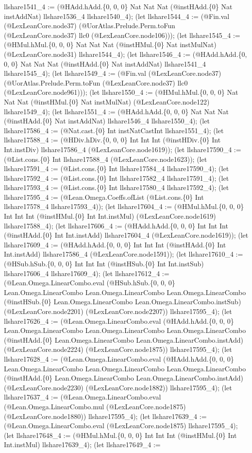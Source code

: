 \documentclass[11pt]{article}
\begin{document}
llshare1541\_4 := (@HAdd.hAdd.\{0, 0, 0\} Nat Nat Nat (@instHAdd.\{0\} Nat instAddNat) llshare1536\_4 llshare1540\_4); (let llshare1544\_4 := (@Fin.val (@LexLeanCore.node37) (@UorAtlas.Prelude.Perm.toFun (@LexLeanCore.node37) llc0 (@LexLeanCore.node106))); (let llshare1545\_4 := (@HMul.hMul.\{0, 0, 0\} Nat Nat Nat (@instHMul.\{0\} Nat instMulNat) (@LexLeanCore.node31) llshare1544\_4); (let llshare1546\_4 := (@HAdd.hAdd.\{0, 0, 0\} Nat Nat Nat (@instHAdd.\{0\} Nat instAddNat) llshare1541\_4 llshare1545\_4); (let llshare1549\_4 := (@Fin.val (@LexLeanCore.node37) (@UorAtlas.Prelude.Perm.toFun (@LexLeanCore.node37) llc0 (@LexLeanCore.node961))); (let llshare1550\_4 := (@HMul.hMul.\{0, 0, 0\} Nat Nat Nat (@instHMul.\{0\} Nat instMulNat) (@LexLeanCore.node122) llshare1549\_4); (let llshare1551\_4 := (@HAdd.hAdd.\{0, 0, 0\} Nat Nat Nat (@instHAdd.\{0\} Nat instAddNat) llshare1546\_4 llshare1550\_4); (let llshare17586\_4 := (@Nat.cast.\{0\} Int instNatCastInt llshare1551\_4); (let llshare17588\_4 := (@HDiv.hDiv.\{0, 0, 0\} Int Int Int (@instHDiv.\{0\} Int Int.instDiv) llshare17586\_4 (@LexLeanCore.node1619)); (let llshare17590\_4 := (@List.cons.\{0\} Int llshare17588\_4 (@LexLeanCore.node1623)); (let llshare17591\_4 := (@List.cons.\{0\} Int llshare17584\_4 llshare17590\_4); (let llshare17592\_4 := (@List.cons.\{0\} Int llshare17582\_4 llshare17591\_4); (let llshare17593\_4 := (@List.cons.\{0\} Int llshare17580\_4 llshare17592\_4); (let llshare17595\_4 := (@Lean.Omega.Coeffs.ofList (@List.cons.\{0\} Int llshare17578\_4 llshare17593\_4)); (let llshare17604\_4 := (@HMul.hMul.\{0, 0, 0\} Int Int Int (@instHMul.\{0\} Int Int.instMul) (@LexLeanCore.node1619) llshare17588\_4); (let llshare17606\_4 := (@HAdd.hAdd.\{0, 0, 0\} Int Int Int (@instHAdd.\{0\} Int Int.instAdd) llshare17604\_4 (@LexLeanCore.node1619)); (let llshare17609\_4 := (@HAdd.hAdd.\{0, 0, 0\} Int Int Int (@instHAdd.\{0\} Int Int.instAdd) llshare17586\_4 (@LexLeanCore.node1591)); (let llshare17610\_4 := (@HSub.hSub.\{0, 0, 0\} Int Int Int (@instHSub.\{0\} Int Int.instSub) llshare17606\_4 llshare17609\_4); (let llshare17612\_4 := (@Lean.Omega.LinearCombo.eval (@HSub.hSub.\{0, 0, 0\} Lean.Omega.LinearCombo Lean.Omega.LinearCombo Lean.Omega.LinearCombo (@instHSub.\{0\} Lean.Omega.LinearCombo Lean.Omega.LinearCombo.instSub) (@LexLeanCore.node2201) (@LexLeanCore.node2207)) llshare17595\_4); (let llshare17626\_4 := (@Lean.Omega.LinearCombo.eval (@HAdd.hAdd.\{0, 0, 0\} Lean.Omega.LinearCombo Lean.Omega.LinearCombo Lean.Omega.LinearCombo (@instHAdd.\{0\} Lean.Omega.LinearCombo Lean.Omega.LinearCombo.instAdd) (@LexLeanCore.node2224) (@LexLeanCore.node1875)) llshare17595\_4); (let llshare17628\_4 := (@Lean.Omega.LinearCombo.eval (@HAdd.hAdd.\{0, 0, 0\} Lean.Omega.LinearCombo Lean.Omega.LinearCombo Lean.Omega.LinearCombo (@instHAdd.\{0\} Lean.Omega.LinearCombo Lean.Omega.LinearCombo.instAdd) (@LexLeanCore.node2230) (@LexLeanCore.node1882)) llshare17595\_4); (let llshare17637\_4 := (@Lean.Omega.LinearCombo.eval (@Lean.Omega.LinearCombo.mul (@LexLeanCore.node1875) (@LexLeanCore.node1880)) llshare17595\_4); (let llshare17639\_4 := (@Lean.Omega.LinearCombo.eval (@LexLeanCore.node1875) llshare17595\_4); (let llshare17648\_4 := (@HMul.hMul.\{0, 0, 0\} Int Int Int (@instHMul.\{0\} Int Int.instMul) llshare17639\_4); (let llshare17649\_4 := 
\end{document}
